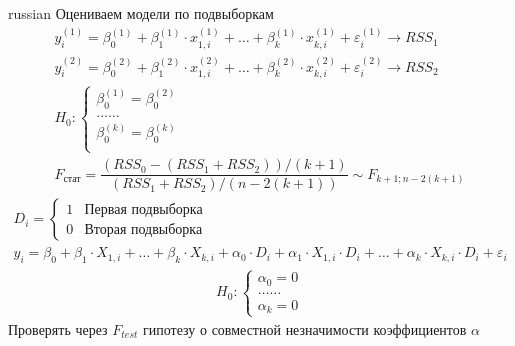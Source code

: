 \documentclass{article}
\begin{document}
\begin{otherlanguage*}{russian}
Оцениваем модели по подвыборкам 
\begin{align*}
y_i^{(1)} = \beta_0^{(1)} + \beta_1^{(1)} \cdot x_{1, i}^{(1)} + \ldots + \beta_k^{(1)} \cdot x_{k, i}^{(1)} + \varepsilon_i^{(1)} \rightarrow RSS_1 \\
y_i^{(2)} = \beta_0^{(2)} + \beta_1^{(2)} \cdot x_{1, i}^{(2)} + \ldots + \beta_k^{(2)} \cdot x_{k, i}^{(2)} + \varepsilon_i^{(2)} \rightarrow RSS_2 \\
H_0: 
\begin{cases}
\beta_0^{(1)} = \beta_0^{(2)} \\
\ldots \ldots \\ 
\beta_0^{(k)} = \beta_0^{(k)} \\
\end{cases} \\
F_{\text{стат}} = \dfrac{(RSS_0 - (RSS_1 + RSS_2)) / (k + 1) }{(RSS_1 + RSS_2) / (n - 2 (k + 1)) } \sim F_{k+1; n- 2(k+1)}
\end{align*}
\begin{align*}
D_i = 
\begin{cases} 
1 & \text{Первая подвыборка} \\ 
0 & \text{Вторая подвыборка} 
\end{cases} \\
y_i = \beta_0 + \beta_1 \cdot X_{1, i} + \ldots + \beta_k \cdot X_{k, i} + \alpha_0 \cdot D_i + \alpha_1 \cdot X_{1, i} \cdot D_i + \ldots + \alpha_k \cdot X_{k, i} \cdot D_i + \varepsilon_i 
\end{align*}
\begin{align*}
H_0: \begin{cases}
\alpha_0 = 0 \\
\ldots \ldots \\ 
\alpha_k = 0 
\end{cases} 
\end{align*}
Проверять через $ F_{test} $ гипотезу о совместной незначимости коэффициентов $ \alpha $ 
\end{otherlanguage*} 
\end{document}
